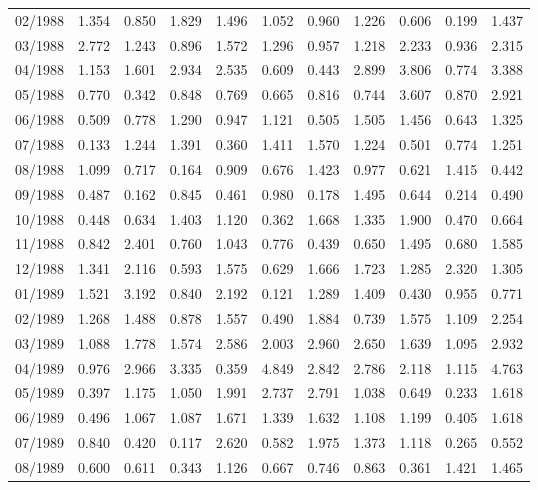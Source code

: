 \begin{tabular}{lrrrrrrrrrr}
02/1988 &  1.354 &  0.850 &  1.829 &  1.496 &  1.052 &  0.960 &  1.226 &  0.606 &  0.199 &  1.437 \\
03/1988 &  2.772 &  1.243 &  0.896 &  1.572 &  1.296 &  0.957 &  1.218 &  2.233 &  0.936 &  2.315 \\
04/1988 &  1.153 &  1.601 &  2.934 &  2.535 &  0.609 &  0.443 &  2.899 &  3.806 &  0.774 &  3.388 \\
05/1988 &  0.770 &  0.342 &  0.848 &  0.769 &  0.665 &  0.816 &  0.744 &  3.607 &  0.870 &  2.921 \\
06/1988 &  0.509 &  0.778 &  1.290 &  0.947 &  1.121 &  0.505 &  1.505 &  1.456 &  0.643 &  1.325 \\
07/1988 &  0.133 &  1.244 &  1.391 &  0.360 &  1.411 &  1.570 &  1.224 &  0.501 &  0.774 &  1.251 \\
08/1988 &  1.099 &  0.717 &  0.164 &  0.909 &  0.676 &  1.423 &  0.977 &  0.621 &  1.415 &  0.442 \\
09/1988 &  0.487 &  0.162 &  0.845 &  0.461 &  0.980 &  0.178 &  1.495 &  0.644 &  0.214 &  0.490 \\
10/1988 &  0.448 &  0.634 &  1.403 &  1.120 &  0.362 &  1.668 &  1.335 &  1.900 &  0.470 &  0.664 \\
11/1988 &  0.842 &  2.401 &  0.760 &  1.043 &  0.776 &  0.439 &  0.650 &  1.495 &  0.680 &  1.585 \\
12/1988 &  1.341 &  2.116 &  0.593 &  1.575 &  0.629 &  1.666 &  1.723 &  1.285 &  2.320 &  1.305 \\
01/1989 &  1.521 &  3.192 &  0.840 &  2.192 &  0.121 &  1.289 &  1.409 &  0.430 &  0.955 &  0.771 \\
02/1989 &  1.268 &  1.488 &  0.878 &  1.557 &  0.490 &  1.884 &  0.739 &  1.575 &  1.109 &  2.254 \\
03/1989 &  1.088 &  1.778 &  1.574 &  2.586 &  2.003 &  2.960 &  2.650 &  1.639 &  1.095 &  2.932 \\
04/1989 &  0.976 &  2.966 &  3.335 &  0.359 &  4.849 &  2.842 &  2.786 &  2.118 &  1.115 &  4.763 \\
05/1989 &  0.397 &  1.175 &  1.050 &  1.991 &  2.737 &  2.791 &  1.038 &  0.649 &  0.233 &  1.618 \\
06/1989 &  0.496 &  1.067 &  1.087 &  1.671 &  1.339 &  1.632 &  1.108 &  1.199 &  0.405 &  1.618 \\
07/1989 &  0.840 &  0.420 &  0.117 &  2.620 &  0.582 &  1.975 &  1.373 &  1.118 &  0.265 &  0.552 \\
08/1989 &  0.600 &  0.611 &  0.343 &  1.126 &  0.667 &  0.746 &  0.863 &  0.361 &  1.421 &  1.465 \\

\end{tabular}
